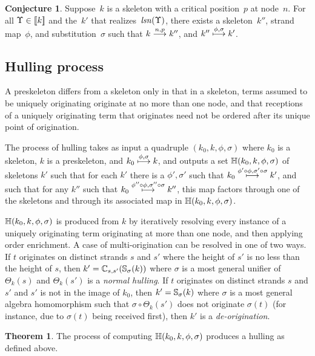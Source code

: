 \documentclass[12pt]{article}
\theoremstyle{definition}
\newtheorem{conj}{Conjecture}[section]
\newtheorem{thm}{Theorem}[section]
\newcommand{\lsn}{\fn{lsn}}
\begin{document}
\begin{conj}
Suppose~$k$ is a skeleton with a critical position~$p$ at node~$n$.
For all $\Upsilon\in[\![k]\!]$ and the~$k'$ that
realizes~$\lsn(\Upsilon)$, there exists a skeleton~$k''$, strand
map~$\phi$, and substitution~$\sigma$ such that $k\stackrel{n,p}{\longrightarrow}k''$,
and $k''\stackrel{\phi,\sigma}{\longmapsto}k'$.
\end{conj}

\subsection{Hulling process}

A preskeleton differs from a skeleton only in that in a skeleton,
terms assumed to be uniquely originating originate at no more than
one node, and that receptions of a uniquely originating term that
originates need not be ordered after its unique point of origination.

The process of hulling takes as input a quadruple $(k_0, k, \phi, \sigma)$
where $k_0$ is a skeleton, $k$ is a preskeleton, and
$k_0 \stackrel{\phi,\sigma}{\longmapsto} k$, and outputs a set $\mathbb H(k_0, k, \phi,
\sigma)$ of skeletons $k'$ such that for each $k'$ there is a $\phi', \sigma'$
such that $k_0 \stackrel{\phi' \circ \phi, \sigma' \circ \sigma}{\longmapsto} k'$, and
such that for any $k''$ such that $k_0 \stackrel{\phi'' \circ \phi, \sigma''
\circ \sigma}{\longmapsto} k''$, this map factors through one of the skeletons and through
its associated map in $\mathbb H(k_0, k, \phi, \sigma)$.

$\mathbb H(k_0, k, \phi, \sigma)$ is produced from $k$ by iteratively
resolving every instance of a uniquely originating term originating at more
than one node, and then applying order enrichment.  A case of multi-origination
can be resolved in one of two ways.  If $t$ originates on distinct strands
$s$ and $s'$ where the height of $s'$ is no less than the height of $s$, then
$k' = \mathbb C_{s,s'} (\mathbb S_\sigma (k))$ where $\sigma$ is a most general
unifier of $\Theta_k(s)$ and $\Theta_k(s')$ is a {\em normal hulling}.
If $t$ originates on distinct strands $s$ and $s'$ and $s'$ is not in the
image of $k_0$, then $k' = \mathbb S_\sigma (k)$ where $\sigma$ is a most
general algebra homomorphism such that $\sigma \circ \Theta_k(s')$
does not originate $\sigma(t)$ (for instance, due to $\sigma(t)$ being
received first), then $k'$ is a {\em de-origination}.

\begin{thm}
The process of computing $\mathbb H(k_0, k, \phi, \sigma)$ produces a
hulling as defined above.
\end{thm}
\end{document}
